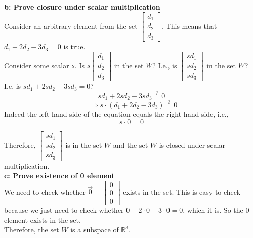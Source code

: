 \begin{enumerate}
{	\textbf{b: Prove closure under scalar multiplication} \\
	Consider an arbitrary element from the set $\begin{bmatrix} d_1 \\ d_2 \\ d_3 \end{bmatrix}$. This means that $d_1 + 2d_2 - 3d_3 = 0$ is true. \\
	Consider some scalar $s$. Is $s\begin{bmatrix} d_1 \\ d_2 \\ d_3 \end{bmatrix}$ in the set $W$? I.e., is $\begin{bmatrix} sd_1 \\ sd_2 \\ sd_3 \end{bmatrix}$ in the set $W$? I.e. is $sd_1 + 2sd_2 - 3sd_3 = 0$?
	$$sd_1 + 2sd_2 - 3sd_3 \stackrel{?}{=} 0$$
	$$\implies s \cdot (d_1 + 2d_2 - 3d_3) \stackrel{?}{=} 0$$
	Indeed the left hand side of the equation equals the right hand side, i.e., $$s\cdot 0 = 0$$

	Therefore, $\begin{bmatrix} sd_1 \\ sd_2 \\ sd_3 \end{bmatrix}$ is in the set $W$ and the set $W$ is closed under scalar multiplication. \\ 

	\textbf{c: Prove existence of 0 element} \\
	We need to check whether $\vec{0} = \begin{bmatrix} 0 \\ 0 \\ 0 \end{bmatrix}$ exists in the set. This is easy to check because we just need to check whether $0 + 2 \cdot 0 - 3 \cdot 0 = 0$, which it is. So the 0 element exists in the set. \\ 

	Therefore, the set $W$ is a subspace of $\mathbb{R}^3$. 
}



\end{enumerate}
